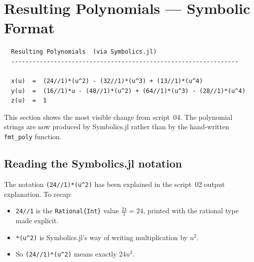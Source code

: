 \documentclass[12pt, a4paper]{article}
\newcommand{\cd}[1]{\texttt{#1}}
\begin{document}
\section{Resulting Polynomials --- Symbolic Format}

\begin{verbatim}
  Resulting Polynomials  (via Symbolics.jl)
  ----------------------------------------------------------------

  x(u)  =  (24//1)*(u^2) - (32//1)*(u^3) + (13//1)*(u^4)
  y(u)  =  (16//1)*u - (48//1)*(u^2) + (64//1)*(u^3) - (28//1)*(u^4)
  z(u)  =  1
\end{verbatim}

This section shows the most visible change from script~04.
The polynomial strings are now produced by Symbolics.jl
rather than by the hand-written \cd{fmt\_poly} function.

\subsection{Reading the Symbolics.jl notation}

The notation \cd{(24//1)*(u\^{}2)} has been explained in the
script~02 output explanation.
To recap:

\begin{itemize}
  \item \cd{24//1} is the \cd{Rational\{Int\}} value
        $\frac{24}{1} = 24$, printed with the rational type
        made explicit.
  \item \cd{*(u\^{}2)} is Symbolics.jl's way of writing
        multiplication by $u^2$.
  \item So \cd{(24//1)*(u\^{}2)} means exactly $24u^2$.
\end{itemize}
\end{document}
